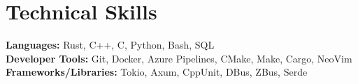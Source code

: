 \section{Technical Skills}
 \begin{itemize}[leftmargin=0.15in, label={}]
    \small{\item{
     \textbf{\color{accent1}Languages:}{ Rust, C++, C, Python, Bash, SQL} \\
     \textbf{\color{accent1}Developer Tools:}{ Git, Docker, Azure Pipelines, CMake, Make, Cargo, NeoVim} \\
     \textbf{\color{accent1}Frameworks/Libraries:}{ Tokio, Axum, CppUnit, DBus, ZBus, Serde}
    }}
 \end{itemize}
